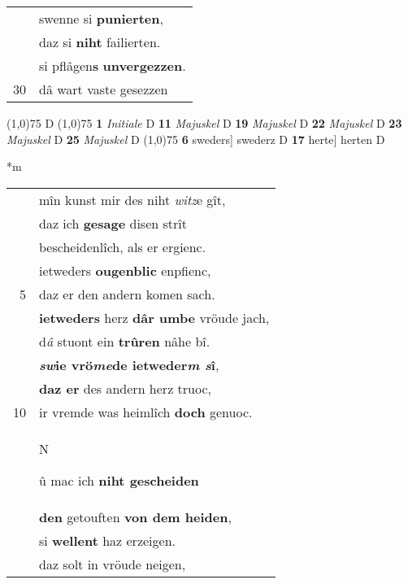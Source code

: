 \documentclass[8pt,a4paper,notitlepage]{article}
\begin{document}
\begin{table}[ht]
\begin{minipage}[t]{0.5\linewidth}
\begin{tabular}{rl}
 & swenne si \textbf{punierten},\\ 
 & daz si \textbf{niht} failierten.\\ 
 & si pflâgen\textbf{s} \textbf{unvergezzen}.\\ 
30 & dâ wart vaste gesezzen\\ 
\end{tabular}
\scriptsize
\line(1,0){75} \newline
D \newline
\line(1,0){75} \newline
\textbf{1} \textit{Initiale} D  \textbf{11} \textit{Majuskel} D  \textbf{19} \textit{Majuskel} D  \textbf{22} \textit{Majuskel} D  \textbf{23} \textit{Majuskel} D  \textbf{25} \textit{Majuskel} D  \newline
\line(1,0){75} \newline
\textbf{6} sweders] swederz D \textbf{17} herte] herten D \newline
\end{minipage}
\hspace{0.5cm}
\begin{minipage}[t]{0.5\linewidth}
\small
\begin{center}*m
\end{center}
\begin{tabular}{rl}
 & mîn kunst mir des niht \textit{witz}e gît,\\ 
 & daz ich \textbf{gesage} disen strît\\ 
 & bescheidenlîch, als er ergienc.\\ 
 & ietweders \textbf{ougenblic} enpfienc,\\ 
5 & daz er den andern komen sach.\\ 
 & \textbf{ietweders} herz \textbf{dâr umbe} vröude jach,\\ 
 & d\textit{â} stuont ein \textbf{trûren} nâhe bî.\\ 
 & \textbf{\textit{sw}ie vrö\textit{me}de ietweder\textit{m s}î},\\ 
 & \textbf{daz er} des andern herz truoc,\\ 
10 & ir vremde was heimlîch \textbf{doch} genuoc.\\ 
 & \begin{Large}N\end{Large}û mac ich \textbf{niht gescheiden}\\ 
 & \textbf{den} getouften \textbf{von dem heiden},\\ 
 & si \textbf{wellent} haz erzeigen.\\ 
 & daz solt in vröude neigen,\\ 

\end{tabular}
\end{minipage}
\end{table}
\end{document}
